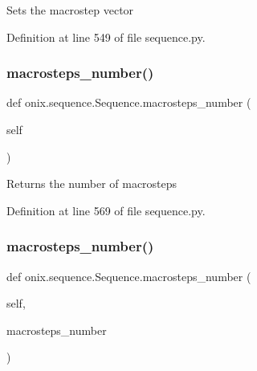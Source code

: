 \begin{DoxyVerb}Sets the macrostep vector\end{DoxyVerb}
 

Definition at line 549 of file sequence.\+py.

\mbox{\label{classonix_1_1sequence_1_1Sequence_a328276e48dc885626226ab678ff9c085}} 
\subsubsection{\texorpdfstring{macrosteps\+\_\+number()}{macrosteps\_number()}\hspace{0.1cm}{\footnotesize\ttfamily [1/2]}}
{\footnotesize\ttfamily def onix.\+sequence.\+Sequence.\+macrosteps\+\_\+number (\begin{DoxyParamCaption}\item[{}]{self }\end{DoxyParamCaption})}

\begin{DoxyVerb}Returns the number of macrosteps\end{DoxyVerb}
 

Definition at line 569 of file sequence.\+py.

\mbox{\label{classonix_1_1sequence_1_1Sequence_acf3011b7009e35380335cc1a1af4ee0a}} 
\subsubsection{\texorpdfstring{macrosteps\+\_\+number()}{macrosteps\_number()}\hspace{0.1cm}{\footnotesize\ttfamily [2/2]}}
{\footnotesize\ttfamily def onix.\+sequence.\+Sequence.\+macrosteps\+\_\+number (\begin{DoxyParamCaption}\item[{}]{self,  }\item[{}]{macrosteps\+\_\+number }\end{DoxyParamCaption})}

